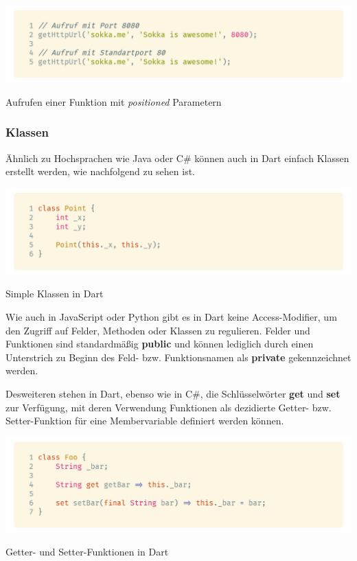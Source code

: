 \begin{code}[h]
    \centering
    \includegraphics[width=1\textwidth]{images/Dart/theory/dartCallPositionedFunction.png}
    \vspace{-25pt}
    \caption{Aufrufen einer Funktion mit \textit{positioned} Parametern}
\end{code}

\newpage

\subsubsection{Klassen}

Ähnlich zu Hochsprachen wie Java oder C\# können auch in Dart einfach Klassen erstellt werden, wie nachfolgend zu sehen ist.

\begin{code}[h]
    \centering
    \includegraphics[width=1\textwidth]{images/Dart/theory/dartClass.png}
    \vspace{-25pt}
    \caption{Simple Klassen in Dart}
\end{code}

Wie auch in JavaScript oder Python gibt es in Dart keine Access-Modifier, um den Zugriff auf Felder, Methoden oder Klassen zu regulieren. Felder und Funktionen sind standardmäßig \textbf{public} und können lediglich durch einen Unterstrich zu Beginn des Feld- bzw. Funktionsnamen als \textbf{private} gekennzeichnet werden.

Desweiteren stehen in Dart, ebenso wie in C\#, die Schlüsselwörter \textbf{get} und \textbf{set} zur Verfügung, mit deren Verwendung Funktionen als dezidierte Getter- bzw.
Setter-Funktion für eine Membervariable definiert werden können.

\begin{code}[h]
    \centering
    \includegraphics[width=1\textwidth]{images/Dart/theory/dartGetterSetter.png}
    \vspace{-25pt}
    \caption{Getter- und Setter-Funktionen in Dart}
\end{code}

